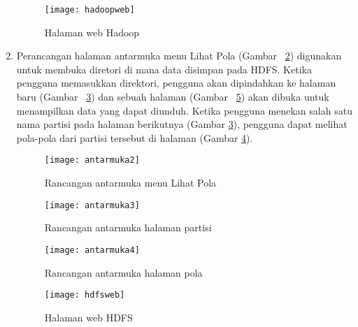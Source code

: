 \begin{enumerate}
\begin{itemize}
\end{itemize} 


\begin{figure}[H]
    \centering  
    \texttt{[image: hadoopweb]}  
    \caption[Halaman web Hadoop]{Halaman web Hadoop} 
    \label{fig:hadoopweb} 
\end{figure}


\item Perancangan halaman antarmuka menu Lihat Pola (Gambar ~\ref{fig:antarmuka2}) digunakan untuk membuka diretori di mana data disimpan pada HDFS. Ketika pengguna memasukkan direktori, pengguna akan dipindahkan ke halaman baru (Gambar ~\ref{fig:antarmuka3}) dan sebuah halaman (Gambar ~\ref{fig:hdfsweb}) akan dibuka untuk menampilkan data yang dapat diunduh. Ketika pengguna menekan salah satu nama partisi pada halaman berikutnya (Gambar \ref{fig:antarmuka3}), pengguna dapat melihat pola-pola dari partisi tersebut di halaman (Gambar \ref{fig:antarmuka4}).  

\begin{figure}[H]
    \centering  
    \texttt{[image: antarmuka2]}  
    \caption[Rancangan antarmuka menu Lihat Pola]{Rancangan antarmuka menu Lihat Pola} 
    \label{fig:antarmuka2} 
\end{figure}

\begin{figure}[H]
    \centering  
    \texttt{[image: antarmuka3]}  
    \caption[Rancangan antarmuka halaman partisi]{Rancangan antarmuka halaman partisi} 
    \label{fig:antarmuka3} 
\end{figure}

\begin{figure}[H]
    \centering  
    \texttt{[image: antarmuka4]}  
    \caption[Rancangan antarmuka halaman pola]{Rancangan antarmuka halaman pola} 
    \label{fig:antarmuka4} 
\end{figure}

\begin{figure}[H]
    \centering  
    \texttt{[image: hdfsweb]}  
    \caption[Halaman web HDFS]{Halaman web HDFS} 
    \label{fig:hdfsweb} 
\end{figure}


\end{enumerate}



